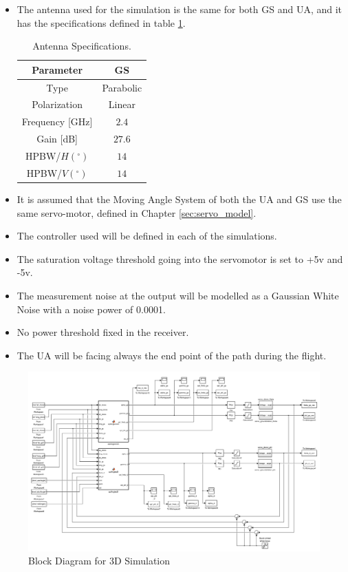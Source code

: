 \begin{itemize}
\item{The antenna used for the simulation is the same for both GS and UA, and it has the specifications defined in table \ref{table:2}.}
\begin{table}[h]
	\centering
	\begin{tabular}{|c||c|}
		\hline
		Parameter & GS\\ \hline\hline
		Type & Parabolic\\ \hline
		Polarization & Linear\\ \hline
		Frequency [GHz] & $2.4$\\ \hline
		Gain [dB] & $27.6$\\ \hline
		HPBW/$H(^{\circ})$ & $14$\\ \hline
		HPBW/$V(^{\circ})$ & $14$\\ \hline
	\end{tabular}
	\caption{Antenna Specifications.}
	\label{table:2}
\end{table}
\item{It is assumed that the Moving Angle System of both the UA and GS use the same servo-motor, defined in Chapter \ref{sec:servo_model}.}
\item{The controller used will be defined in each of the simulations.}
\item{The saturation voltage threshold going into the servomotor is set to +5v and -5v.}
\item{The measurement noise at the output will be modelled as a Gaussian White Noise with a noise power of 0.0001.}
\item{No power threshold fixed in the receiver.}
\item{The UA will be facing always the end point of the path during the flight.}
\end{itemize}

\clearpage

\begin{figure}
	\centering
	\includegraphics[width=1.1\textwidth,height=1.1\textheight,keepaspectratio]{figures/diagram_3D.png}
	\caption{Block Diagram for 3D Simulation}
   	\label{fig:diagram3D}
\end{figure}

\clearpage





